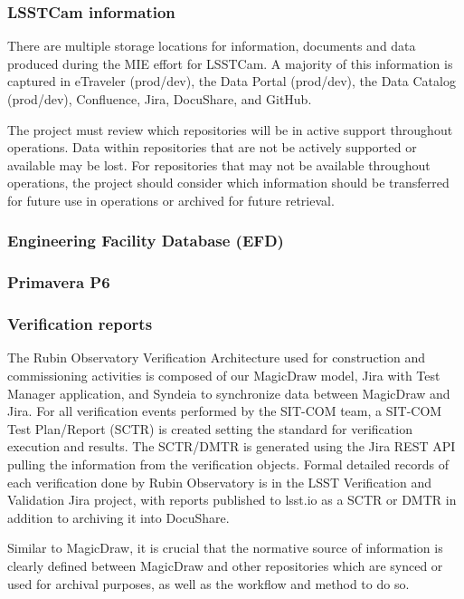 \subsubsection{LSSTCam information}

There are multiple storage locations for information, documents and data produced during the MIE effort for LSSTCam.
A majority of this information is captured in eTraveler (prod/dev), the Data Portal (prod/dev), the Data Catalog (prod/dev), Confluence, Jira, DocuShare, and GitHub.

The project must review which repositories will be in active support throughout operations.
Data within repositories that are not be actively supported or available may be lost.
For repositories that may not be available throughout operations, the project should consider which information should be transferred for future use in operations or archived for future retrieval.

\subsubsection{Engineering Facility Database (EFD)}



\subsubsection{Primavera P6}



\subsubsection{Verification reports}

The Rubin Observatory Verification Architecture used for construction and commissioning activities is composed of our MagicDraw model, Jira with Test Manager application, and Syndeia to synchronize data between MagicDraw and Jira.
For all verification events performed by the SIT-COM team, a SIT-COM Test Plan/Report (SCTR) is created setting the standard for verification execution and results.
The SCTR/DMTR is generated using the Jira REST API pulling the information from the verification objects.
Formal detailed records of each verification done by Rubin Observatory is in the LSST Verification and Validation Jira project, with reports published to lsst.io as a SCTR or DMTR in addition to archiving it into DocuShare.

Similar to MagicDraw, it is crucial that the normative source of information is clearly defined between MagicDraw and other repositories which are synced or used for archival purposes, as well as the workflow and method to do so.


